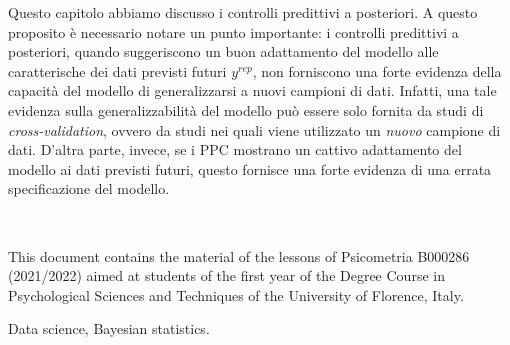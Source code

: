 \documentclass[
  10pt,
  italian,
  a4paper,
  extrafontsizes,onecolumn,openright
  ]{memoir}
\makeatletter
\newcommand{\MemoirChapStyle}{daleif1}
\newcommand{\MemoirPageStyle}{Ruled}
\newlength\widthw %
\newcommand*{\SmallMargins}{
  \setlrmarginsandblock{1.5in}{1.5in}{*}
  \setmarginnotes{0.1in}{0.1in}{0.1in}
 \setulmarginsandblock{1.5in}{1in}{*}
  \checkandfixthelayout
  \ch@ngetext
  \clearpage
  \setlength{\widthw}{\textwidth+\marginparsep+\marginparwidth}
  \footnotesatfoot
  \chapterstyle{\MemoirChapStyle}  %
  \pagestyle{\MemoirPageStyle}
}
\newcommand{\LargeMargins}{\SmallMargins}
\newcommand{\evenpage}{
  \clearpage
  \strictpagecheck %
  \checkoddpage
  \ifoddpage
    \thispagestyle{empty}
    ~\\ %
    \newpage
  \else
  \fi
}
\makeatother
\begin{document}
Questo capitolo abbiamo discusso i controlli predittivi a posteriori. A questo proposito è necessario notare un punto importante: i controlli predittivi a posteriori, quando suggeriscono un buon adattamento del modello alle caratterische dei dati previsti futuri \(y^{rep}\), non forniscono una forte evidenza della capacità del modello di generalizzarsi a nuovi campioni di dati. Infatti, una tale evidenza sulla generalizzabilità del modello può essere solo fornita da studi di \emph{cross-validation}, ovvero da studi nei quali viene utilizzato un \emph{nuovo} campione di dati. D'altra parte, invece, se i PPC mostrano un cattivo adattamento del modello ai dati previsti futuri, questo fornisce una forte evidenza di una errata specificazione del modello.



\backmatter
\SmallMargins

\printbibliography
\onecolumn




\cleardoublepage
\LargeMargins
\listoffigures







\evenpage
\SmallMargins
\thispagestyle{empty}

\begin{normalsize}

\begin{description}

\item[Abstract]
This document contains the material of the lessons of Psicometria B000286 (2021/2022) aimed at students of the first year of the Degree Course in Psychological Sciences and Techniques of the University of Florence, Italy.
\item[Keywords]
Data science, Bayesian statistics.
~\\

\end{description}

\end{normalsize}
\end{document}
